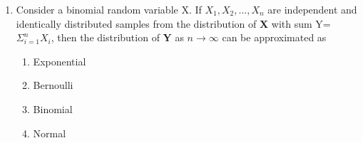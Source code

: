 %
\renewcommand{\theequation}{\theenumi}
\renewcommand{\thefigure}{\theenumi}
\renewcommand{\thetable}{\theenumi}
\begin{enumerate}[label=\thesection.\arabic*.,ref=\thesection.\theenumi]


\item Consider a binomial random variable X. If \textbf{$X_1,X_2,...,X_n$} are independent and identically distributed samples from the distribution of \textbf{X} with sum Y=$\Sigma_{i=1}^n X_i$, then the distribution of \textbf{Y} as $n\rightarrow \infty$ can be approximated as
\begin{enumerate}
    \item Exponential
    \item Bernoulli 
    \item Binomial
    \item Normal
\end{enumerate}
%
\solution


\end{enumerate}